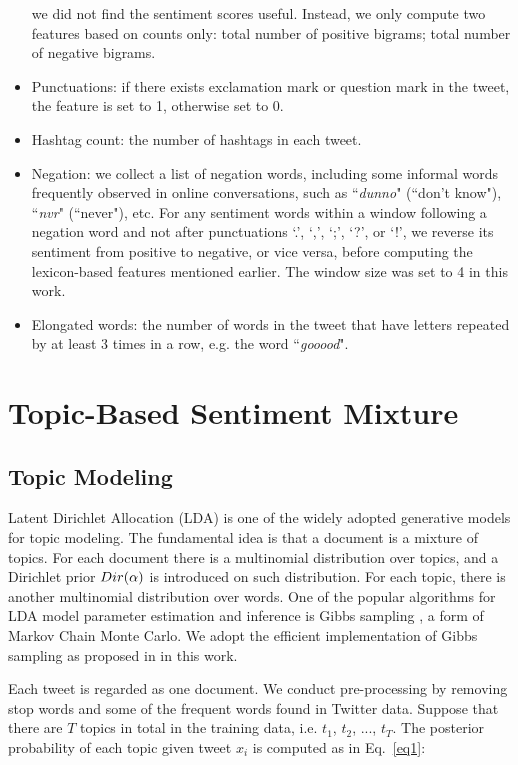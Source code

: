 \documentclass[11pt]{article}
\begin{document}
\begin{itemize}
we did not find the sentiment scores useful. Instead, we only compute two features based on counts only: 
total number of positive bigrams; total number of negative bigrams. 
\item Punctuations: if there exists exclamation mark or question mark in the tweet, the feature is set to 1, otherwise
set to 0.
\item Hashtag count: the number of hashtags in each tweet.
\item Negation: we collect a list of negation words, including some informal words frequently observed in
online conversations, such as ``\textit{dunno}" (``don't know"), ``\textit{nvr}" (``never"), etc. For any sentiment words
within a window following a negation word and not after punctuations `.', `,', `;', `?', or `!', we reverse 
its sentiment from positive to negative, or vice versa, before computing the lexicon-based features 
mentioned earlier. The window size was set to 4 in this work.
\item Elongated words: the number of words in the tweet that have letters repeated by at least 3 times in a row, e.g. 
the word ``\textit{gooood}".
\end{itemize}

\section{Topic-Based Sentiment Mixture}

\subsection{Topic Modeling}
Latent Dirichlet Allocation (LDA) \cite{Blei:03} is one of the widely adopted generative models for topic modeling. 
The fundamental idea is that a document is a mixture of topics. For each document there is a multinomial
distribution over topics, and a Dirichlet prior $Dir({\bf \alpha})$ is introduced on such distribution. 
For each topic, there is
another multinomial distribution over words.  One of the popular algorithms for LDA model parameter 
estimation and inference is Gibbs sampling \cite{Griffiths:04}, a form of Markov Chain Monte Carlo.
We adopt the efficient implementation of Gibbs sampling as proposed in \cite{Yao:09} in this work.

Each tweet is regarded as one document. We conduct pre-processing by removing stop words and some of the frequent words 
found in Twitter data. Suppose that there are $T$ topics in total in the training data, 
i.e. $t_1$, $t_2$, ..., $t_T$. The posterior probability of each topic given tweet $x_i$ is computed as in Eq.~\ref{eq1}: 
\end{document}
